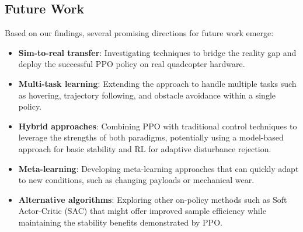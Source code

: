 \documentclass[12pt]{article}
\begin{document}
%     
%     
%     
%     

\subsection{Future Work}

Based on our findings, several promising directions for future work emerge:


\begin{itemize}
    \item \textbf{Sim-to-real transfer}: Investigating techniques to bridge the reality gap and deploy the successful PPO policy on real quadcopter hardware.
    
    \item \textbf{Multi-task learning}: Extending the approach to handle multiple tasks such as hovering, trajectory following, and obstacle avoidance within a single policy.
    
    \item \textbf{Hybrid approaches}: Combining PPO with traditional control techniques to leverage the strengths of both paradigms, potentially using a model-based approach for basic stability and RL for adaptive disturbance rejection.
    
    \item \textbf{Meta-learning}: Developing meta-learning approaches that can quickly adapt to new conditions, such as changing payloads or mechanical wear.
    
    \item \textbf{Alternative algorithms}: Exploring other on-policy methods such as Soft Actor-Critic (SAC) that might offer improved sample efficiency while maintaining the stability benefits demonstrated by PPO.
\end{itemize}
\end{document}
